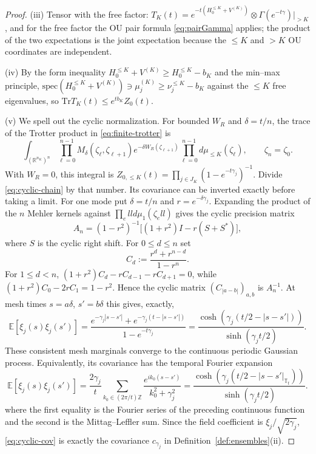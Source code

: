 \documentclass[11pt,a4paper]{article}
\theoremstyle{plain}
\theoremstyle{definition}
\newcommand{\R}{\mathbb{R}}
\newcommand{\Z}{\mathbb{Z}}
\newcommand{\T}{\mathbb{T}}
\newcommand{\E}{\mathbb{E}}
\newcommand{\Trace}{\mathrm{Tr}}
\newcommand{\muv}{\mu}
\newcommand{\Gam}{\Gamma}
\begin{document}
\begin{proof}
(iii) Tensor with the free factor: $T_K(t)=e^{-t(H^{\le
K}_0+V^{(K)})}\otimes\Gam(e^{-t\gamma})|_{>K}$, and for the free factor
the OU pair formula \eqref{eq:pairGamma} applies; the product of the two
expectations is the joint expectation because the $\le K$ and $>K$
OU coordinates are independent.

(iv) By the form inequality $H_0^{\le K}+V^{(K)}\ge H_0^{\le K}-b_K$
and the min--max principle,
$\mathrm{spec}(H^{\le K}_0+V^{(K)})\ni\mu^{(K)}_j\ge\nu^{\le K}_j-b_K$
against the $\le K$ free eigenvalues, so
$\Trace T_K(t)\le e^{tb_K}Z_0(t)$.

(v) We spell out the cyclic normalization.  For bounded $W_R$ and
$\delta=t/n$, the trace of the Trotter product in
\eqref{eq:finite-trotter} is
\begin{equation}
 \int_{(\R^{n_K})^n}
 \prod_{\ell=0}^{n-1}
 M_\delta(\zeta_\ell,\zeta_{\ell+1})
 e^{-\delta W_R(\zeta_{\ell+1})}
 \prod_{\ell=0}^{n-1}d\muv_{\le K}(\zeta_\ell),
 \qquad \zeta_n=\zeta_0.                                           \label{eq:cyclic-chain}
\end{equation}
With $W_R=0$, this integral is
$Z_{0,\le K}(t)=\prod_{j\in J_K}(1-e^{-t\gamma_j})^{-1}$.  Divide
\eqref{eq:cyclic-chain} by that number.  Its covariance can be inverted
exactly before taking a limit.  For one mode put $\delta=t/n$ and
$r=e^{-\delta\gamma_j}$.  Expanding the product of the $n$ Mehler kernels
against $\prod_ell d\muv_1(\zeta_ell)$ gives the cyclic precision matrix
\[
 A_n=(1-r^2)^{-1}\bigl[(1+r^2)I-r(S+S^*)\bigr],
\]
where $S$ is the cyclic right shift.  For $0\le d\le n$ set
\[
 C_d:=\frac{r^d+r^{n-d}}{1-r^n}.
\]
For $1\le d<n$, $(1+r^2)C_d-rC_{d-1}-rC_{d+1}=0$, while
$(1+r^2)C_0-2rC_1=1-r^2$.  Hence the cyclic matrix
$(C_{|a-b|})_{a,b}$ is $A_n^{-1}$.  At mesh times
$s=a\delta$, $s'=b\delta$ this gives, exactly,
\[
 \E[\xi_j(s)\xi_j(s')]
 =\frac{e^{-\gamma_j|s-s'|}+e^{-\gamma_j(t-|s-s'|)}}
        {1-e^{-t\gamma_j}}
 =\frac{\cosh(\gamma_j(t/2-|s-s'|))}{\sinh(\gamma_jt/2)}.
\]
These consistent mesh marginals converge to the continuous periodic Gaussian
process.  Equivalently, its covariance has the temporal Fourier expansion
\begin{equation}
 \E[\xi_j(s)\xi_j(s')]
 =\frac{2\gamma_j}{t}\sum_{k_0\in(2\pi/t)\Z}
   \frac{e^{ik_0(s-s')}}{k_0^2+\gamma_j^2}
 =\frac{\cosh(\gamma_j(t/2-|s-s'|_{\T_t}))}
        {\sinh(\gamma_jt/2)}.                                     \label{eq:cyclic-cov}
\end{equation}
where the first equality is the Fourier series of the preceding continuous
function and the second is the Mittag--Leffler sum.  Since the field coefficient is
$\xi_j/\sqrt{2\gamma_j}$, \eqref{eq:cyclic-cov} is exactly the covariance
$c_{\gamma_j}$ in Definition~\ref{def:ensembles}(ii).


\end{proof}
\end{document}
